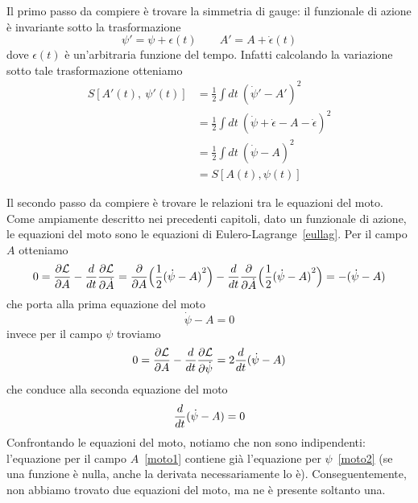     Il primo passo da compiere è trovare la simmetria di gauge: il funzionale di azione è invariante sotto la trasformazione
    \begin{equation}\label{arbitraria}
        \psi' = \psi + \epsilon(t) \qquad A' = A + \dot \epsilon(t)
    \end{equation}
    dove $\epsilon(t)$ è un'arbitraria funzione del tempo. Infatti calcolando la variazione sotto tale trasformazione otteniamo 
    \begin{equation*}
    \begin{aligned}
        S[A'(t),~\psi'(t)] & = \frac{1}{2} \int dt ~ {(\dot \psi' - A')}^2 \\ & = \frac{1}{2} \int dt ~ {(\dot \psi + \dot \epsilon - A - \dot \epsilon )}^2 \\ & = \frac{1}{2} \int dt ~ {(\dot \psi - A)}^2 \\ & = S[A(t),\psi(t)]
    \end{aligned}
    \end{equation*}
    
    Il secondo passo da compiere è trovare le relazioni tra le equazioni del moto. Come ampiamente descritto nei precedenti capitoli, dato un funzionale di azione, le equazioni del moto sono le equazioni di Eulero-Lagrange~\eqref{eullag}.
    Per il campo $A$ otteniamo 
    \begin{equation*}
        0 = \frac{\partial\mathcal L}{\partial A} - \frac{d}{dt} \frac{\partial\mathcal L}{\partial\dot A} = \frac{\partial}{\partial A} \Big (\frac{1}{2} {(\dot \psi - A)}^2 \Big ) - \frac{d}{dt} \frac{\partial}{\partial\dot A} \Big (\frac{1}{2} {(\dot \psi - A)}^2 \Big ) = - (\dot \psi - A)
    \end{equation*}
    che porta alla prima equazione del moto 
    \begin{equation} \label{moto1}
        \dot \psi - A = 0
    \end{equation}
    invece per il campo $\psi$ troviamo
    \begin{equation*}
        0 = \frac{\partial\mathcal L}{\partial A} - \frac{d}{dt} \frac{\partial\mathcal L}{\partial\dot \psi} = 2 \frac{d}{dt} (\dot \psi - A)
    \end{equation*}
    che conduce alla seconda equazione del moto 
    \begin{equation} \label{moto2}
        \frac{d}{dt} (\dot \psi - A) = 0
    \end{equation}
    Confrontando le equazioni del moto, notiamo che non sono indipendenti: l'equazione per il campo $A$~\eqref{moto1} contiene già l'equazione per $\psi$~\eqref{moto2} (se una funzione è nulla, anche la derivata necessariamente lo è). Conseguentemente, non abbiamo trovato due equazioni del moto, ma ne è presente soltanto una. 
    
